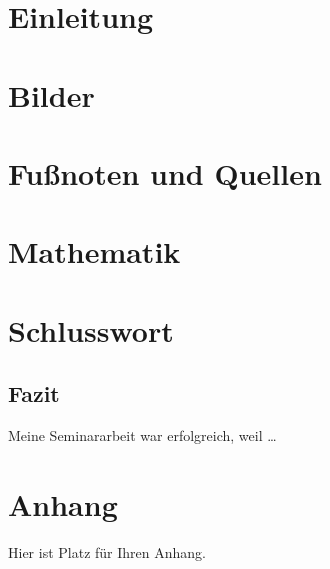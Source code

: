 \documentclass{article}
\begin{document}
    \setupSeminararbeit{}
    


    \section{Einleitung}
    
    \newpage

    \section{Bilder}
    
    \newpage



    \section{Fußnoten und Quellen}
    
    \newpage



    \section{Mathematik}
    



    
    \newpage




    \section{Schlusswort}
    \subsection{Fazit}
    Meine Seminararbeit war erfolgreich, weil \dots
    \newpage


    \insertOfficialDocs{}


    \section{Anhang}
    Hier ist Platz für Ihren Anhang.
\end{document}
